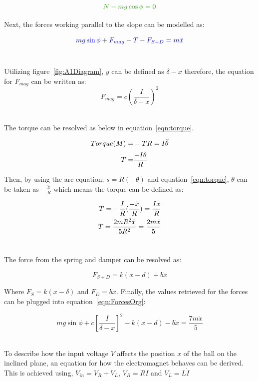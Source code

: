 \documentclass[a4paper,10pt,reqno]{amsart}
\numberwithin{equation}{section}
\begin{document}
\begin{equation}
    \color{darkGreen}{N-mg\cos{\phi}=0}\color{black}
\end{equation}


\par Next, the forces working parallel to the slope can be modelled as:

\begin{equation}
\label{eqn:ForcesOrg}
    \color{blue}{mg\sin{\phi}+F_{mag}-T-F_{S+D}=m\ddot{x}}\color{black}
\end{equation}
\\
\par Utilizing figure~\ref{fig:A1Diagram}, $y$ can be defined as $\delta-x$ therefore, the equation for $F_{mag}$ can be written as:
\begin{equation}
    F_{mag} = c(\frac{I}{\delta-x})^2
\end{equation}
\\
\par The torque can be resolved as below in equation~\ref{eqn:torque}.

\begin{align}
    Torque(M)=&-TR=I\ddot{\theta}
    \notag\\
    T =& \frac{-I\ddot{\theta}}{R}
    \label{eqn:torque}
\end{align}

\par Then, by using the arc equation; $s=R(-\theta)$ and equation~\ref{eqn:torque}, $\ddot{\theta}$ can be taken as $-\frac{\ddot{x}}{R}$ which means the torque can be defined as:

\begin{align}
    T=-\frac{I}{R}(\frac{-\ddot{x}}{R}) = \frac{I\ddot{x}}{R}
    \notag\\
    T = \frac{2mR^2\ddot{x}}{5R^2} = \frac{2m\ddot{x}}{5}
\end{align}
\\
\par The force from the spring and damper can be resolved as:

\begin{equation}
    F_{S+D}=k(x-d)+b\dot{x}
\end{equation}

\par Where $F_{S}=k(x-\delta)$ and $F_D=b\dot{x}$. Finally, the values retrieved for the forces can be plugged into equation~\ref{eqn:ForcesOrg}:

\begin{equation}
    mg\sin{\phi}+c[\frac{I}{\delta-x}]^2-k(x-d)-b\dot{x}=\frac{7m\ddot{x}}{5}
\end{equation}
\\
\par To describe how the input voltage $V$ affects the position $x$ of the ball on the inclined plane, an equation for how the electromagnet behaves can be derived. This is achieved using, $V_{in}=V_R+V_L$, $V_R=RI$ and $V_L=L\dot{I}$
\end{document}
